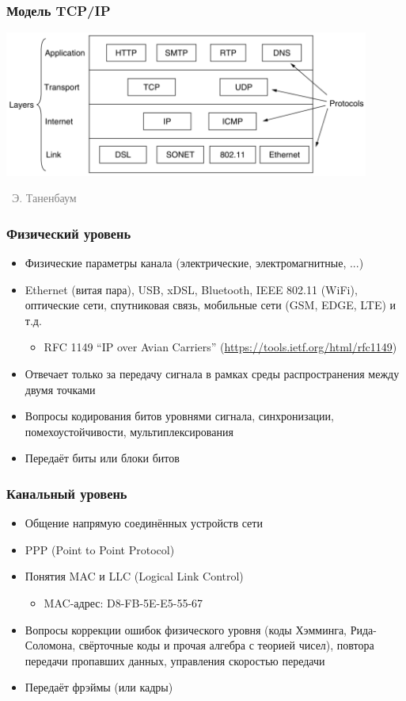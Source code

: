\documentclass[xetex,mathserif,serif]{beamer}
\newcommand{\attribution}[1] {
\vspace{-5mm}\begin{flushright}\begin{scriptsize}\textcolor{gray}{\textcopyright\, #1}\end{scriptsize}\end{flushright}
}
\begin{document}
    \begin{frame}
        \frametitle{Модель TCP/IP}
        \begin{center}
            \includegraphics[width=0.9\textwidth]{tcpIpStack.png}
            \attribution{Э. Таненбаум}
        \end{center}
    \end{frame}

    \begin{frame}
        \frametitle{Физический уровень}
        \begin{itemize}
            \item Физические параметры канала (электрические, электромагнитные, ...)
            \item Ethernet (витая пара), USB, xDSL, Bluetooth, IEEE 802.11 (WiFi), оптические сети, спутниковая связь, мобильные сети (GSM, EDGE, LTE) и т.д.
            \begin{itemize}
                \item RFC 1149 ``IP over Avian Carriers'' (\url{https://tools.ietf.org/html/rfc1149})
            \end{itemize}
            \item Отвечает только за передачу сигнала в рамках среды распространения между двумя точками
            \item Вопросы кодирования битов уровнями сигнала, синхронизации, помехоустойчивости, мультиплексирования
            \item Передаёт биты или блоки битов
        \end{itemize}
    \end{frame}

    \begin{frame}
        \frametitle{Канальный уровень}
        \begin{itemize}
            \item Общение напрямую соединённых устройств сети
            \item PPP (Point to Point Protocol)
            \item Понятия MAC и LLC (Logical Link Control)
            \begin{itemize}
                \item MAC-адрес: D8-FB-5E-E5-55-67
            \end{itemize}
            \item Вопросы коррекции ошибок физического уровня (коды Хэмминга, Рида-Соломона, свёрточные коды и прочая алгебра с теорией чисел), повтора передачи пропавших данных, управления скоростью передачи
            \item Передаёт фрэймы (или кадры)
        \end{itemize}
    \end{frame}
\end{document}
